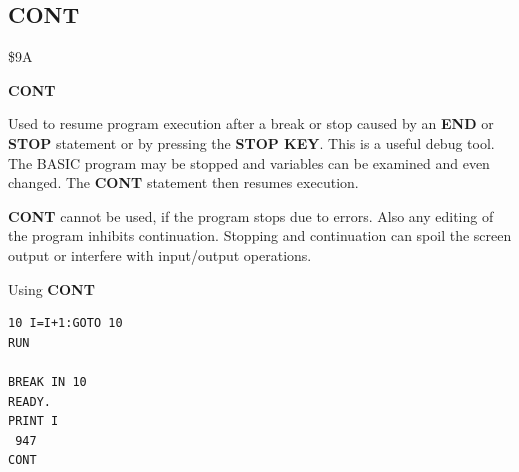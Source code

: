 \subsection{CONT}
\begin{description}[leftmargin=2cm,style=nextline]
\item [Token:] \$9A
\item [Format:] {\bf CONT}
\item [Usage:] Used to resume
               program execution after a break or stop caused by
               an {\bf END} or {\bf STOP} statement or by pressing
               the {\bf STOP KEY}.
               This is a useful debug tool. The BASIC program may be stopped
               and variables can be examined and even changed.
               The {\bf CONT} statement then resumes execution.
\item [Remarks:] {\bf CONT} cannot be used, if the program stops
               due to errors. Also any editing of the program
               inhibits continuation. Stopping and continuation
               can spoil the screen output or interfere with
               input/output operations.
\item [Example:] Using {\bf CONT}
\begin{tcolorbox}[colback=black,coltext=white]
\verbatimfont{\codefont}
\begin{verbatim}
10 I=I+1:GOTO 10
RUN

BREAK IN 10
READY.
PRINT I
 947
CONT
\end{verbatim}
\end{tcolorbox}
\end{description}


\newpage
